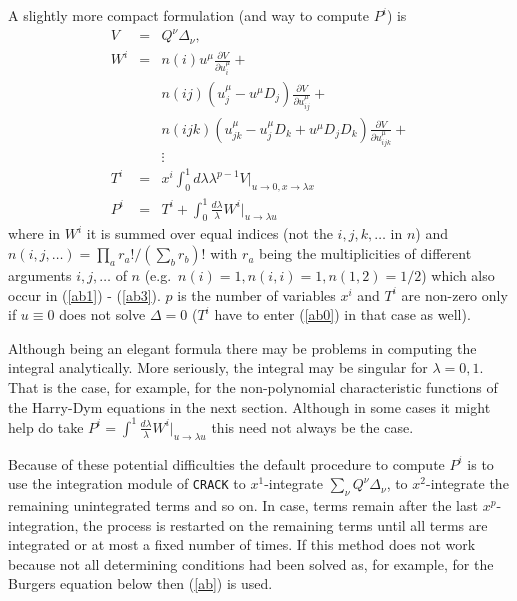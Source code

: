 A slightly more compact formulation (and way to compute $P^i$) is
\begin{eqnarray}
V&=&Q^{\nu} \Delta_{\nu}, \nonumber \\
W^i
&=& n(i) u^{\mu} \frac{\partial V}{\partial u^{\mu}_i} +  \nonumber \\
& & n(ij) \left(u^{\mu}_j -u^{\mu}D_j\right) \frac{\partial V}{\partial u^{\mu}_{ij}} +  \nonumber \\
& & n(ijk) \left( u^{\mu}_{jk} - u^{\mu}_jD_k + u^{\mu}D_jD_k \right)
    \frac{\partial V}{\partial u^{\mu}_{ijk}} +  \nonumber \\
& & \vdots  \nonumber \\
   T^i&=& x^i \int^1_0 d \lambda \lambda^{p-1} V|_{u\rightarrow 0,
x\rightarrow \lambda x}  \nonumber \\
   P^i&=& T^i + \int^1_0 \frac{d \lambda}{\lambda} W^i|_{u\rightarrow \lambda u}
\label{ab}
\end{eqnarray}
where in $W^i$ it is summed over equal indices (not the $i,j,k,\ldots$ in $n$) and
$n(i,j,\ldots)=\prod_a r_a!/ (\sum_b r_b)! $ with $r_a$ being the multiplicities
of different
arguments $i,j,\ldots$ of $n$ (e.g.\ $n(i)=1, n(i,i)=1, n(1,2)=1/2$)
which also occur in (\ref{ab1}) - (\ref{ab3}).
$p$ is the number of variables $x^i$ and $T^i$ are non-zero only if
$u\equiv 0$ does not solve $\Delta=0$ ($T^i$ have to enter (\ref{ab0})
in that case as well).

Although being an elegant formula there may be problems in computing the
integral analytically. More seriously, the integral may be singular for
$\lambda=0,1$. That is the case, for example, for the non-polynomial
characteristic functions of the Harry-Dym equations in the next section.
Although in some cases it might help do take $P^i = \int^1
\frac{d \lambda}{\lambda} W^i|_{u\rightarrow \lambda u}$
this need not always be the case.

Because of these potential difficulties
the default procedure to compute $P^i$ is to use
the integration module of {\tt CRACK} to
$x^1$-integrate $\sum_{\nu} Q^{\nu} \Delta_{\nu}$, to $x^2$-integrate
the remaining unintegrated terms and so on. In case, terms remain
after the last $x^p$-integration, the process is restarted
on the remaining terms
until all terms are integrated or at most a fixed number of times.
If this method does not work because not all determining conditions had been
solved as, for example, for the Burgers equation
below then (\ref{ab}) is used.

